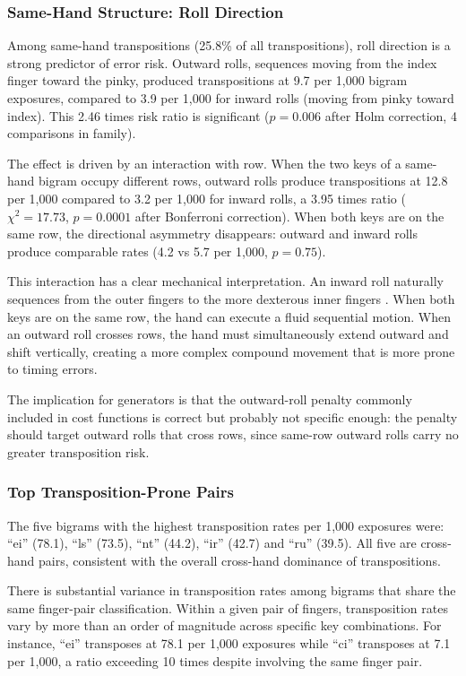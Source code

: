 \documentclass[12pt]{article}
\begin{document}
\subsubsection{Same-Hand Structure: Roll Direction}

Among same-hand transpositions (25.8\% of all transpositions), roll direction is a strong predictor of error risk. Outward rolls, sequences moving from the index finger toward the pinky, produced transpositions at 9.7 per 1,000 bigram exposures, compared to 3.9 per 1,000 for inward rolls (moving from pinky toward index). This 2.46 times risk ratio is significant ($p = 0.006$ after Holm correction, 4 comparisons in family).

The effect is driven by an interaction with row. When the two keys of a same-hand bigram occupy different rows, outward rolls produce transpositions at 12.8 per 1,000 compared to 3.2 per 1,000 for inward rolls, a 3.95 times ratio ($\chi^2 = 17.73$, $p = 0.0001$ after Bonferroni correction). When both keys are on the same row, the directional asymmetry disappears: outward and inward rolls produce comparable rates (4.2 vs 5.7 per 1,000, $p = 0.75$).

This interaction has a clear mechanical interpretation. An inward roll naturally sequences from the outer fingers to the more dexterous inner fingers \citep{salthouse1986}. When both keys are on the same row, the hand can execute a fluid sequential motion. When an outward roll crosses rows, the hand must simultaneously extend outward and shift vertically, creating a more complex compound movement that is more prone to timing errors.

The implication for generators is that the outward-roll penalty commonly included in cost functions is correct but probably not specific enough: the penalty should target outward rolls that cross rows, since same-row outward rolls carry no greater transposition risk.

\subsubsection{Top Transposition-Prone Pairs}

The five bigrams with the highest transposition rates per 1,000 exposures were: ``ei'' (78.1), ``ls'' (73.5), ``nt'' (44.2), ``ir'' (42.7) and ``ru'' (39.5). All five are cross-hand pairs, consistent with the overall cross-hand dominance of transpositions.

There is substantial variance in transposition rates among bigrams that share the same finger-pair classification. Within a given pair of fingers, transposition rates vary by more than an order of magnitude across specific key combinations. For instance, ``ei'' transposes at 78.1 per 1,000 exposures while ``ci'' transposes at 7.1 per 1,000, a ratio exceeding 10 times despite involving the same finger pair.
\end{document}
